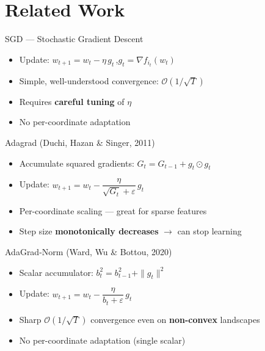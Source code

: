 \documentclass[aspectratio=169, 12pt]{beamer}
\begin{document}
\section{Related Work}

\begin{frame}{SGD --- Stochastic Gradient Descent}
\begin{itemize}
  \setlength{\itemsep}{0.5cm}
  \item Update: $w_{t+1} = w_t - \eta\, g_t$\,,\quad $g_t = \nabla f_{i_t}(w_t)$
  \item Simple, well-understood convergence: $\mathcal{O}(1/\sqrt{T})$
  \item Requires \textbf{careful tuning} of $\eta$
  \item No per-coordinate adaptation
\end{itemize}
\end{frame}

\begin{frame}{Adagrad \small(Duchi, Hazan \& Singer, 2011)}
\begin{itemize}
  \setlength{\itemsep}{0.4cm}
  \item Accumulate squared gradients: $G_t = G_{t-1} + g_t \odot g_t$
  \item Update: $w_{t+1} = w_t - \dfrac{\eta}{\sqrt{G_t} + \varepsilon}\, g_t$
  \item[\color{green!60!black}\textbf{+}] Per-coordinate scaling --- great for sparse features
  \item[\color{red!70!black}\textbf{--}] Step size \textbf{monotonically decreases} $\to$ can stop learning
\end{itemize}
\end{frame}

\begin{frame}{AdaGrad-Norm \small(Ward, Wu \& Bottou, 2020)}
\begin{itemize}
  \setlength{\itemsep}{0.4cm}
  \item Scalar accumulator: $b_t^2 = b_{t-1}^2 + \|g_t\|^2$
  \item Update: $w_{t+1} = w_t - \dfrac{\eta}{b_t + \varepsilon}\, g_t$
  \item[\color{green!60!black}\textbf{+}] Sharp $\mathcal{O}(1/\sqrt{T})$ convergence even on \textbf{non-convex} landscapes
  \item[\color{red!70!black}\textbf{--}] No per-coordinate adaptation (single scalar)
\end{itemize}
\end{frame}
\end{document}
